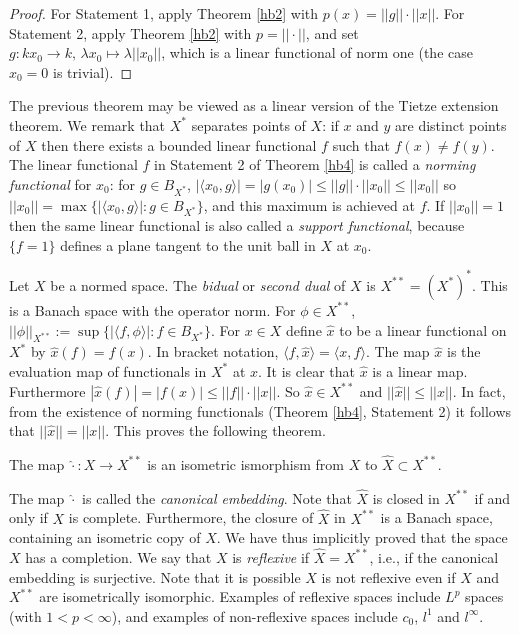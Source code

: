 \begin{proof}
  For Statement 1, apply Theorem \ref{hb2} with $p(x)=||g||\cdot ||x||$.
  For Statement 2, apply Theorem \ref{hb2} with $p=||\cdot||$,
  and set $g:kx_0\to k,\, \lambda x_0\mapsto \lambda ||x_0||$,
  which is a linear functional of norm one (the case $x_0=0$ is trivial).
\end{proof}

The previous theorem may be viewed as a linear version of the Tietze extension theorem.
We remark that $X^*$ separates points of $X$: if $x$ and $y$ are distinct points of $X$
then there exists a bounded linear functional $f$ such that $f(x)\neq f(y)$.
The linear functional $f$ in Statement 2 of Theorem \ref{hb4} is called a \emph{norming functional}
 for $x_0$:
for $g\in B_{X^*}$,
$|\langle x_0,g\rangle|=|g(x_0)|\leq ||g||\cdot ||x_0||\leq ||x_0||$
so $||x_0||=\max\{|\langle x_0,g\rangle|:g\in B_{X^*}\}$,
and this maximum is achieved at $f$.
If $||x_0||=1$ then
the same linear functional is also called a \emph{support functional},
because $\{f=1\}$ defines a plane tangent to the unit ball in $X$ at $x_0$.


Let $X$ be a normed space. The \emph{bidual} or \emph{second dual}
of $X$ is $X^{**}=(X^*)^*$.
This is a Banach space with the operator norm.
For $\phi\in X^{**}$, $||\phi||_{X^{**}}:=\sup\{|\langle f,\phi\rangle|:f\in B_{X^*}\}$.
For $x\in X$ define $\hat x$ to be a linear functional on $X^*$ by $\hat x(f)=f(x)$.
In bracket notation, $\langle f,\hat x\rangle=\langle x,f\rangle$.
The map $\hat x$ is the evaluation map of functionals in $X^*$ at $x$.
It is clear that $\hat x$ is a linear map. Furthermore
$|\hat x(f)|=|f(x)|\leq ||f||\cdot ||x||$.
So $\hat x\in X^{**}$ and $||\hat x||\leq ||x||$.
In fact, from the existence of norming functionals (Theorem \ref{hb4}, Statement 2) it follows that
$||\hat x||= ||x||$. This proves the following theorem.

\begin{theorem}
  The map $\hat \cdot: X\to X^{**}$
  is an isometric ismorphism from $X$ to $\hat X\subset X^{**}$.
\end{theorem}
The map $\hat\cdot$ is called the \emph{canonical embedding}.
Note that $\hat X$ is closed in $X^{**}$ if and only if $X$ is complete.
Furthermore, the closure of $\hat X$ in $X^{**}$ is a Banach space,
containing an isometric copy of $X$. We have thus implicitly proved that the space $X$
has a completion.
We say that $X$ is \emph{reflexive} if $\hat X=X^{**}$, i.e.,
if the canonical embedding is surjective.
Note that it is possible $X$ is not reflexive even if
 $X$ and $X^{**}$ are isometrically isomorphic.
Examples of reflexive spaces include $L^p$ spaces (with $1<p<\infty$),
and examples of non-reflexive spaces include $c_0$, $l^1$ and $l^\infty$.











%
